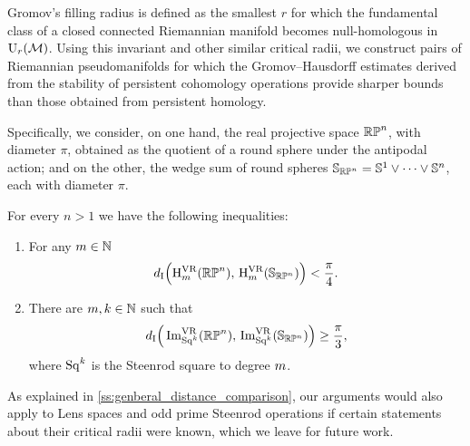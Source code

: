 Gromov's filling radius is defined as the smallest \(r\) for which the fundamental class of a closed connected Riemannian manifold becomes null-homologous in \(\mathrm{U}_r(\mathcal{M})\).
Using this invariant and other similar critical radii, we construct pairs of Riemannian pseudomanifolds for which the Gromov--Hausdorff estimates derived from the stability of persistent cohomology operations provide sharper bounds than those obtained from persistent homology.



Specifically, we consider, on one hand, the real projective space \(\mathbb{RP}^n\), with diameter \(\pi\), obtained as the quotient of a round sphere under the antipodal action; and on the other, the wedge sum of round spheres \(\mathbb{S}_{\mathbb{RP}^n} = \mathbb{S}^1 \vee \dots \vee \mathbb{S}^n\), each with diameter \(\pi\).

\medskip\theorem
For every \(n > 1\) we have the following inequalities:
\begin{enumerate}
	\item For any \(m \in \mathbb{N}\)
	\[
	d_{\mathrm{I}}\Big(\mathrm{H}^{\mathrm{VR}}_m(\mathbb{RP}^n),\, \mathrm{H}^{\mathrm{VR}}_m(\mathbb{S}_{\mathbb{RP}^n})\Big) < \frac{\pi}{4}.
	\]

	\item There are \(m, k \in \mathbb{N}\) such that
	\[
	d_{\mathrm{I}}\Big(\operatorname{Im}_{\mathrm{Sq}^k}^{\mathrm{VR}}(\mathbb{RP}^n),\, \operatorname{Im}_{\mathrm{Sq}^k}^{\mathrm{VR}}(\mathbb{S}_{\mathbb{RP}^n})\Big) \geq \frac{\pi}{3},
	\]
	where \(\mathrm{Sq}^k\) is the Steenrod square to degree \(m\).
\end{enumerate}

\medskip As explained in \cref{ss:genberal_distance_comparison}, our arguments would also apply to Lens spaces and odd prime Steenrod operations if certain statements about their critical radii were known, which we leave for future work.